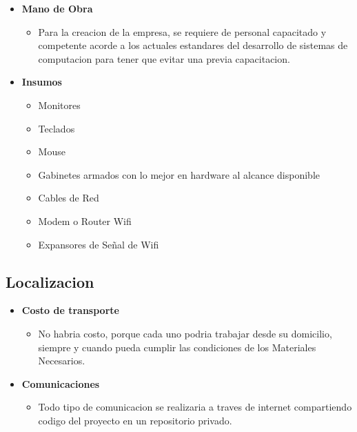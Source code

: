 \documentclass[
10pt, %
a4paper, %
oneside, %
headinclude,footinclude, %
BCOR5mm, %
]{scrartcl}
\begin{document}
\begin{itemize}
  \item \textbf {Mano de Obra}
  \begin{itemize}
    \item Para la creacion de la empresa, se requiere de personal capacitado y
            competente acorde a los actuales estandares del desarrollo de sistemas
            de computacion para tener que evitar una previa capacitacion.
  \end{itemize}

  \item \textbf {Insumos}
  \begin{itemize}
    \item Monitores
    \item Teclados
    \item Mouse
    \item Gabinetes armados con lo mejor en hardware al alcance disponible
    \item Cables de Red
    \item Modem o Router Wifi
    \item Expansores de Señal de Wifi
  \end{itemize}
\end{itemize}

\subsection{Localizacion}
\begin{itemize}
  \item \textbf {Costo de transporte}
  \begin{itemize}
    \item No habria costo, porque cada uno podria trabajar
            desde su domicilio, siempre y cuando pueda cumplir
            las condiciones de los Materiales Necesarios.
  \end{itemize}

  \item \textbf {Comunicaciones}
  \begin{itemize}
    \item Todo tipo de comunicacion se realizaria a traves de internet
            compartiendo codigo del proyecto en un repositorio privado.
  \end{itemize}
\end{itemize}
\end{document}
